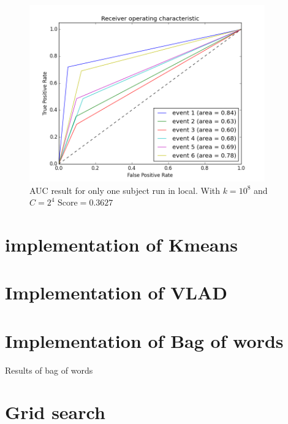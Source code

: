 \documentclass[]{article}
\begin{document}
\begin{center}
\begin{figure}\caption{AUC result for only one subject run in local. With $k=10^8$ and $C=2^{4}$ Score$=0.3627$}
\includegraphics[height=3.0in]{plots/oneSubjectAUCC16.png}
\end{figure}
\end{center}





\section{implementation of Kmeans}

\section{Implementation of VLAD}

\section{Implementation of Bag of words}
Results of bag of words

\section{Grid search}
\end{document}
